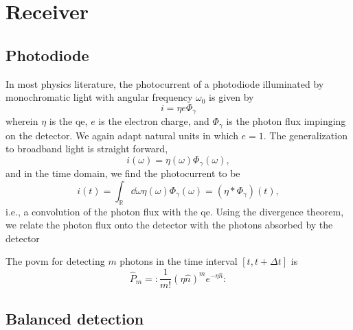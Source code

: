 \section{Receiver}

\subsection{Photodiode}

In most physics literature, the photocurrent of a photodiode illuminated by monochromatic light with angular frequency $\omega_0$ is given by~\cite[p.~650]{Saleh2007}
\begin{equation}
	i
	=
	\eta
	e
	\Phi_\gamma
\end{equation}
wherein $\eta$ is the \gls{qe}, $e$ is the electron charge, and $\Phi_\gamma$ is the photon flux impinging on the detector.
We again adapt natural units in which $e=1$.
The generalization to broadband light is straight forward,
\begin{equation}
	i(\omega)
	=
	\eta(\omega)
	\Phi_\gamma(\omega)
	,
\end{equation}
and in the time domain, we find the photocurrent to be
\begin{equation}
	i(t)
	=
	\int_{\mathbb{R}}\dd{\omega}
	\eta(\omega)
	\Phi_\gamma(\omega)
	=
	\left(\eta*\Phi_\gamma\right)(t)
	,
\end{equation}
i.e., a convolution of the photon flux with the \gls{qe}.
Using the divergence theorem, we relate the photon flux onto the detector with the photons absorbed by the detector

The \gls{povm} for detecting $m$ photons in the time interval $[t,t+\Delta t]$ is~\cite[p.~192]{Vogel2006}
\begin{equation}
	\hat{P}_m
	=
	\colon
	\frac{1}{m!}
	\left(\eta\hat{n}\right)^m
	e^{-\eta\hat{n}}
	\colon
\end{equation}



\subsection{Balanced detection}

